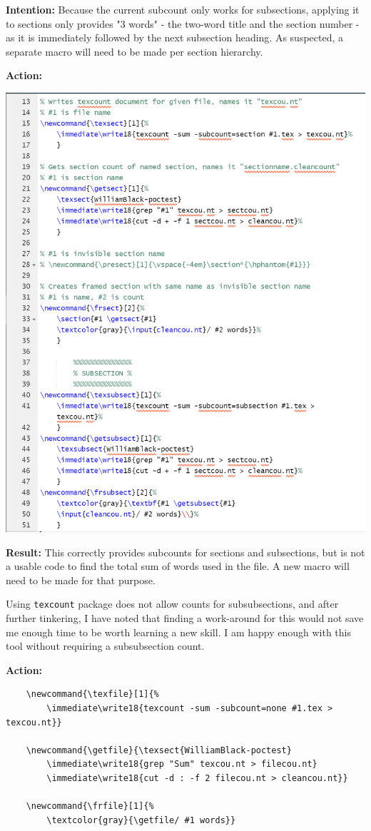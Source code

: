 \documentclass[12pt]{article}
\begin{document}
\textbf{Intention:} Because the current subcount only works for subsections, applying it to sections only provides "3 words" - the two-word title and the section number - as it is immediately followed by the next subsection heading. As suspected, a separate macro will need to be made per section hierarchy.

\textbf{Action:}

\includegraphics[scale=0.9]{imgelaborationsubsectcount.PNG}

\textbf{Result:} This correctly provides subcounts for sections and subsections, but is not a usable code to find the total sum of words used in the file. A new macro will need to be made for that purpose. 

Using \texttt{texcount} package does not allow counts for subsubsections, and after further tinkering, I have noted that finding a work-around for this would not save me enough time to be worth learning a new skill. I am happy enough with this tool without requiring a subsubsection count.

\textbf{Action:}
\begin{verbatim}
    \newcommand{\texfile}[1]{%
        \immediate\write18{texcount -sum -subcount=none #1.tex > texcou.nt}}
    
    \newcommand{\getfile}{\texsect{WilliamBlack-poctest}
        \immediate\write18{grep "Sum" texcou.nt > filecou.nt}
        \immediate\write18{cut -d : -f 2 filecou.nt > cleancou.nt}}

    \newcommand{\frfile}[1]{%
        \textcolor{gray}{\getfile/ #1 words}}
\end{verbatim}
\end{document}
